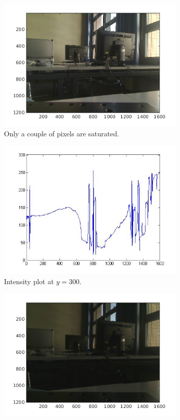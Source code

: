 \documentclass[a4paper, 12pt]{paper}
\begin{document}
\begin{figure}[h]
\begin{subfigure}[p]{0.40\textwidth}
        \includegraphics[width=\textwidth]{img/little_sat}
        \caption{Only a couple of pixels are saturated.}
    \end{subfigure}
    \begin{subfigure}[p]{0.40\textwidth}
        \includegraphics[width=\textwidth]{img/little_int}
        \caption{Intensity plot at $y=300$.}
    \end{subfigure}
    \begin{subfigure}[p]{0.40\textwidth}
        \includegraphics[width=\textwidth]{img/no_sat}

\end{subfigure}
\end{figure}
\end{document}
